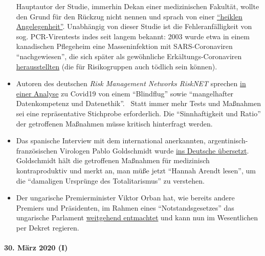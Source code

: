 \begin{itemize}
  Hauptautor der Studie, immerhin Dekan einer medizinischen Fakultät,
  wollte den Grund für den Rückzug nicht nennen und sprach von einer
  \href{https://www.npr.org/sections/health-shots/2020/03/26/822084429/in-defense-of-coronavirus-testing-strategy-administration-cited-retracted-study}{``heiklen
  Angelegenheit''}. Unabhängig von dieser Studie ist die
  Fehleranfälligkeit von sog. PCR-Virentests indes seit langem bekannt:
  2003 wurde etwa in einem kanadischen Pflegeheim eine Masseninfektion
  mit SARS-Coronaviren ``nachgewiesen'', die sich später als gewöhnliche
  Erkältungs-Coronaviren
  \href{https://www.ncbi.nlm.nih.gov/pmc/articles/PMC2095096/}{herausstellten}
  (die für Risikogruppen auch tödlich sein können).
\item
  Autoren des deutschen \emph{Risk Management Networks RiskNET} sprechen
  \href{https://www.risknet.de/themen/risknews/covid-19-und-der-blindflug/}{in
  einer Analyse} zu Covid19 von einem ``Blindflug'' sowie ``mangelhafter
  Datenkompetenz und Datenethik''.~ Statt immer mehr Tests und Maßnahmen
  sei eine repräsentative Stichprobe erforderlich. Die ``Sinnhaftigkeit
  und Ratio'' der getroffenen Maßnahmen müsse kritisch hinterfragt
  werden.
\item
  Das spanische Interview mit dem international anerkannten,
  argentinisch-französischen Virologen Pablo Goldschmidt wurde
  \href{https://www.rubikon.news/artikel/der-corona-totalitarismus}{ins
  Deutsche übersetzt}. Goldschmidt hält die getroffenen Maßnahmen für
  medizinisch kontraproduktiv und merkt an, man müße jetzt ``Hannah
  Arendt lesen'', um die ``damaligen Ursprünge des Totalitarismus'' zu
  verstehen.
\item
  Der ungarische Premierminister Viktor Orban hat, wie bereits andere
  Premiers und Präsidenten, im Rahmen eines ``Notstandsgesetzes'' das
  ungarische Parlament \href{https://www.krone.at/2127086}{weitgehend
  entmachtet} und kann nun im Wesentlichen per Dekret regieren.
\end{itemize}

\hypertarget{30-muxe4rz-2020-i}{%
\paragraph{30. März 2020 (I)}\label{30-muxe4rz-2020-i}}

